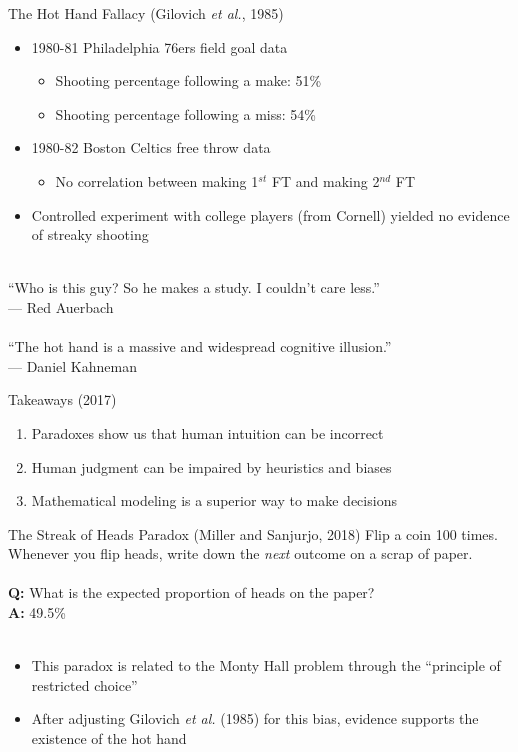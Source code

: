 \documentclass[handout]{beamer}
\begin{document}
  \begin{frame}{The Hot Hand Fallacy (Gilovich {\it et al.}, 1985)}
    \begin{itemize}
      \item 1980-81 Philadelphia 76ers field goal data
      \begin{itemize}
        \item Shooting percentage following a make: 51\%
        \item Shooting percentage following a miss: 54\%
      \end{itemize}
      \item 1980-82 Boston Celtics free throw data
      \begin{itemize}
        \item No correlation between making 1$^{st}$ FT and making 2$^{nd}$ FT
      \end{itemize}
      \item Controlled experiment with college players (from Cornell) yielded no evidence of streaky shooting
    \end{itemize}
    ~\\
    ``Who is this guy? So he makes a study. I couldn't care less.''\\
    \hfill--- Red Auerbach\\
    ~\\
    ``The hot hand is a massive and widespread cognitive illusion.''\\
    \hfill--- Daniel Kahneman
  \end{frame}

  \begin{frame}{Takeaways (2017)}
    \begin{enumerate}
      \item Paradoxes show us that human intuition can be incorrect
      \item Human judgment can be impaired by heuristics and biases
      \item Mathematical modeling is a superior way to make decisions
    \end{enumerate}
  \end{frame}

  \begin{frame}{The Streak of Heads Paradox (Miller and Sanjurjo, 2018)}
    Flip a coin 100 times. Whenever you flip heads, write down the {\it next} outcome on a scrap of paper.\\
    ~\\
    {\bf Q:} What is the expected proportion of heads on the paper?\\
    \pause
    {\bf A:} 49.5\%\\
    ~\\
    \begin{itemize}
      \item This paradox is related to the Monty Hall problem through the ``principle of restricted choice''
      \item After adjusting Gilovich {\it et al.} (1985) for this bias, evidence supports the existence of the hot hand
    \end{itemize}
  \end{frame}
\end{document}
